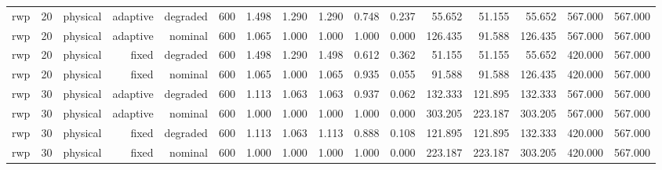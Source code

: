 \begin{tabular}{lrrrrrrrrrrrrrrr}
rwp & 20 & physical & adaptive & degraded & 600 & 1.498 & 1.290 & 1.290 & 0.748 & 0.237 & 55.652 & 51.155 & 55.652 & 567.000 & 567.000 \\
rwp & 20 & physical & adaptive & nominal & 600 & 1.065 & 1.000 & 1.000 & 1.000 & 0.000 & 126.435 & 91.588 & 126.435 & 567.000 & 567.000 \\
rwp & 20 & physical & fixed & degraded & 600 & 1.498 & 1.290 & 1.498 & 0.612 & 0.362 & 51.155 & 51.155 & 55.652 & 420.000 & 567.000 \\
rwp & 20 & physical & fixed & nominal & 600 & 1.065 & 1.000 & 1.065 & 0.935 & 0.055 & 91.588 & 91.588 & 126.435 & 420.000 & 567.000 \\
rwp & 30 & physical & adaptive & degraded & 600 & 1.113 & 1.063 & 1.063 & 0.937 & 0.062 & 132.333 & 121.895 & 132.333 & 567.000 & 567.000 \\
rwp & 30 & physical & adaptive & nominal & 600 & 1.000 & 1.000 & 1.000 & 1.000 & 0.000 & 303.205 & 223.187 & 303.205 & 567.000 & 567.000 \\
rwp & 30 & physical & fixed & degraded & 600 & 1.113 & 1.063 & 1.113 & 0.888 & 0.108 & 121.895 & 121.895 & 132.333 & 420.000 & 567.000 \\
rwp & 30 & physical & fixed & nominal & 600 & 1.000 & 1.000 & 1.000 & 1.000 & 0.000 & 223.187 & 223.187 & 303.205 & 420.000 & 567.000 \\
\bottomrule
\end{tabular}